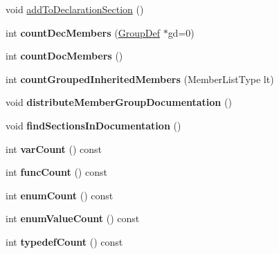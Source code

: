 \begin{DoxyCompactItemize}
\item 
void \mbox{\hyperlink{class_member_group_a1dc30e752b0c36ee2be1716ff8d83856}{add\+To\+Declaration\+Section}} ()
\item 
\mbox{\label{class_member_group_a36f705d27aff743dd93c3d69b9afc74b}} 
int {\bfseries count\+Dec\+Members} (\mbox{\hyperlink{class_group_def}{Group\+Def}} $\ast$gd=0)
\item 
\mbox{\label{class_member_group_ac6a226c5fa7a4458e4fd7bc1be86665a}} 
int {\bfseries count\+Doc\+Members} ()
\item 
\mbox{\label{class_member_group_a9134204269c78e233a4160a10653a04f}} 
int {\bfseries count\+Grouped\+Inherited\+Members} (Member\+List\+Type lt)
\item 
\mbox{\label{class_member_group_a7814e5796402b44a7ee813a2bd5c23eb}} 
void {\bfseries distribute\+Member\+Group\+Documentation} ()
\item 
\mbox{\label{class_member_group_a4aa10086246b592da7042c7431755374}} 
void {\bfseries find\+Sections\+In\+Documentation} ()
\item 
\mbox{\label{class_member_group_ae8e602350117b079f8128bf199cc8ef2}} 
int {\bfseries var\+Count} () const
\item 
\mbox{\label{class_member_group_ac139604604c89bf0815e9a1681117c25}} 
int {\bfseries func\+Count} () const
\item 
\mbox{\label{class_member_group_affb69a017f2da3594bebb7c6b4b1f1f6}} 
int {\bfseries enum\+Count} () const
\item 
\mbox{\label{class_member_group_a7f376064190ac1a0e002f19dd4e73d86}} 
int {\bfseries enum\+Value\+Count} () const
\item 
\mbox{\label{class_member_group_acf1ad7742ba1a068f8ca283825cfd849}} 
int {\bfseries typedef\+Count} () const
\item 
\mbox{\label{class_member_group_a974ed1a74e20dfe8c69d7617822b41ff}} 

\end{DoxyCompactItemize}
